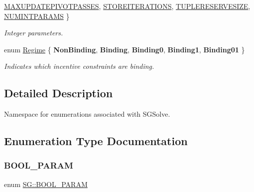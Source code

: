 \begin{DoxyCompactItemize}
\hyperlink{namespaceSG_a031898e6fc0fa14d8590f85da9715f37a7f8a56b4aad56d44fdb2f080089e276e}{M\+A\+X\+U\+P\+D\+A\+T\+E\+P\+I\+V\+O\+T\+P\+A\+S\+S\+ES}, 
\hyperlink{namespaceSG_a031898e6fc0fa14d8590f85da9715f37a68cb47214b02cf2b8a4f78fff84fd42c}{S\+T\+O\+R\+E\+I\+T\+E\+R\+A\+T\+I\+O\+NS}, 
\newline
\hyperlink{namespaceSG_a031898e6fc0fa14d8590f85da9715f37a4a8ef477625ba609140795f362b09a8b}{T\+U\+P\+L\+E\+R\+E\+S\+E\+R\+V\+E\+S\+I\+ZE}, 
\hyperlink{namespaceSG_a031898e6fc0fa14d8590f85da9715f37a783be7f32402b1402939255426796f7c}{N\+U\+M\+I\+N\+T\+P\+A\+R\+A\+MS}
 \}\begin{DoxyCompactList}\small\item\em Integer parameters. \end{DoxyCompactList}
\item 
\mbox{\label{namespaceSG_a139e4dec41ea0f38aae1f93f60cfff60}} 
enum \hyperlink{namespaceSG_a139e4dec41ea0f38aae1f93f60cfff60}{Regime} \{ \newline
{\bfseries Non\+Binding}, 
{\bfseries Binding}, 
{\bfseries Binding0}, 
{\bfseries Binding1}, 
\newline
{\bfseries Binding01}
 \}\begin{DoxyCompactList}\small\item\em Indicates which incentive constraints are binding. \end{DoxyCompactList}
\end{DoxyCompactItemize}


\subsection{Detailed Description}
Namespace for enumerations associated with S\+G\+Solve. 

\subsection{Enumeration Type Documentation}
\mbox{\label{namespaceSG_a0b164afe6c58be3386d9e3f6e857b673}} 
\subsubsection{\texorpdfstring{B\+O\+O\+L\+\_\+\+P\+A\+R\+AM}{BOOL\_PARAM}}
{\footnotesize\ttfamily enum \hyperlink{namespaceSG_a0b164afe6c58be3386d9e3f6e857b673}{S\+G\+::\+B\+O\+O\+L\+\_\+\+P\+A\+R\+AM}}



